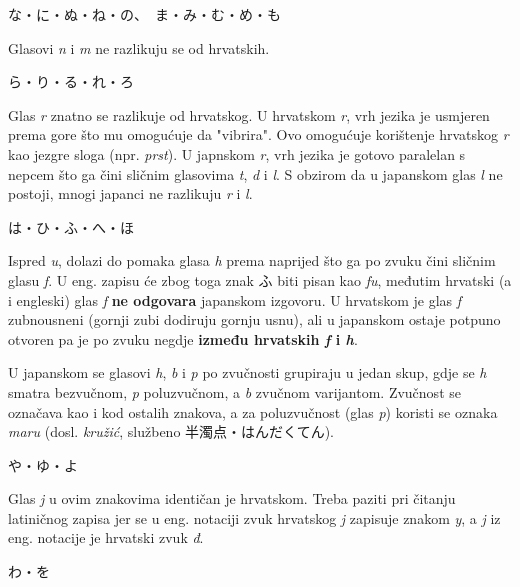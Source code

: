 	\vspace{5pt}
	\noindent\ten な・に・ぬ・ね・の、　ま・み・む・め・も
	
	Glasovi \textit{n} i \textit{m} ne razlikuju se od hrvatskih.
	
	\vspace{5pt}
	\noindent\ten ら・り・る・れ・ろ
	
	Glas \textit{r} znatno se razlikuje od hrvatskog. U hrvatskom \textit{r}, vrh jezika je usmjeren prema gore što mu omogućuje da "vibrira". Ovo omogućuje korištenje hrvatskog \textit{r} kao jezgre sloga (npr. \textit{prst}). U japnskom \textit{r}, vrh jezika je gotovo paralelan s nepcem što ga čini sličnim glasovima \textit{t}, \textit{d} i \textit{l}. S obzirom da u japanskom glas \textit{l} ne postoji, mnogi japanci ne razlikuju \textit{r} i \textit{l}.
	
	\vspace{5pt}
	\noindent\ten は・ひ・ふ・へ・ほ
	
	Ispred \textit{u}, dolazi do pomaka glasa \textit{h} prema naprijed što ga po zvuku čini sličnim glasu \textit{f}. U eng. zapisu će zbog toga znak ふ biti pisan kao \textit{fu}, međutim hrvatski (a i engleski) glas \textit{f} \textbf{ne odgovara} japanskom izgovoru. U hrvatskom je glas \textit{f} zubnousneni (gornji zubi dodiruju gornju usnu), ali u japanskom ostaje potpuno otvoren pa je po zvuku negdje \textbf{između hrvatskih \textit{f} i \textit{h}}.
	
	U japanskom se glasovi \textit{h}, \textit{b} i \textit{p} po zvučnosti grupiraju u jedan skup, gdje se \textit{h} smatra bezvučnom, \textit{p} poluzvučnom\footnotemark[2], a \textit{b} zvučnom varijantom. Zvučnost se označava kao i kod ostalih znakova, a za poluzvučnost (glas \textit{p}) koristi se oznaka \textit{maru} (dosl. \textit{kružić}, službeno 半濁点・はんだくてん).
	
	
	\vspace{5pt}
	\noindent\ten や・ゆ・よ
	
	Glas \textit{j} u ovim znakovima identičan je hrvatskom. Treba paziti pri čitanju latiničnog zapisa jer se u eng. notaciji zvuk hrvatskog \textit{j} zapisuje znakom \textit{y}, a \textit{j} iz eng. notacije je hrvatski zvuk \textit{đ}.
	
	\vspace{5pt}
	\noindent\ten わ・を
	
